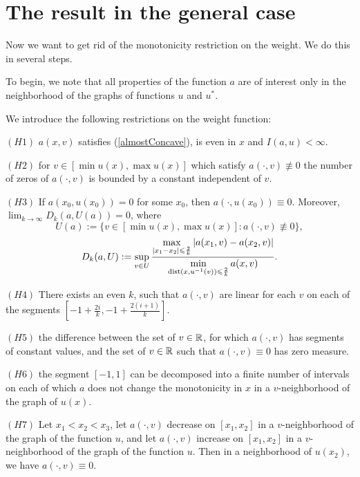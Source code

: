 \section{The result in the general case}

Now we want to get rid of the monotonicity restriction on the weight.
We do this in several steps.

To begin, we note that all properties of the function $a$ are of interest
only in the neighborhood of the graphs of functions $u$ and $u^*$.

We introduce the following restrictions on the weight function:

\bigskip

\smallskip
\noindent
$(H1)$ $a(x, v)$ satisfies (\ref{almostConcave}), is even in $x$ and $I(a, u) < \infty$.
\smallskip

\bigskip
\noindent
$(H2)$ for $v \in [\min u(x), \max u(x)]$
which satisfy $a(\cdot, v) \not \equiv 0$
the number of zeros of $a(\cdot, v)$ is bounded by a constant
independent of $v$.

\bigskip
\noindent
$(H3)$ If $a(x_0, u(x_0)) = 0$ for some $x_0$, then $a(\cdot, u(x_0)) \equiv 0$.
Moreover, $\lim_{k \to \infty} D_k(a, U(a)) = 0$, where
$$U(a) := \{ v \in [\min u(x), \max u(x)]: a(\cdot, v) \not \equiv 0 \},$$
\begin{equation}
\label{bigD}
D_k(a, U): = \sup \limits_{v \in U}
\frac{\max \limits_{\abs{x_1 - x_2} \le \frac{2}{k}} \abs{a(x_1, v) - a(x_2, v)}}
{\min \limits_{\dist (x, u^{-1} (v)) \le \frac{2}{k}} a(x, v)}.
\end{equation}

\bigskip
\noindent
$(H4)$ There exists an even $k$, such that $a(\cdot, v)$ are linear for each $v$ on each of the segments
$[-1 + \frac{2i}{k}, -1 + \frac{2(i + 1)}{k}]$.

\bigskip
\noindent
$(H5)$ the difference between the
set of $v \in \mathbb R$, for which $a(\cdot, v)$ has segments of constant values,
and the set of $v \in \mathbb R$ such that $a(\cdot, v) \equiv 0$
has zero measure.

\bigskip
\noindent
$(H6)$ the segment $[-1, 1]$ can be decomposed into a finite number of intervals
on each of which $a$ does not change the monotonicity in $x$ in a $v$-neighborhood of the graph of $u(x)$.

\bigskip
\noindent
$(H7)$ Let $x_1 < x_2 < x_3$,
let $a(\cdot, v)$ decrease on $[x_1, x_2]$ in a $v$-neighborhood of the graph of the function $u$,
and let $a(\cdot, v)$ increase on $[x_1, x_2]$ in a $v$-neighborhood of the graph of the function $u$.
Then in a neighborhood of $u(x_2)$, we have $a(\cdot, v) \equiv 0$.

